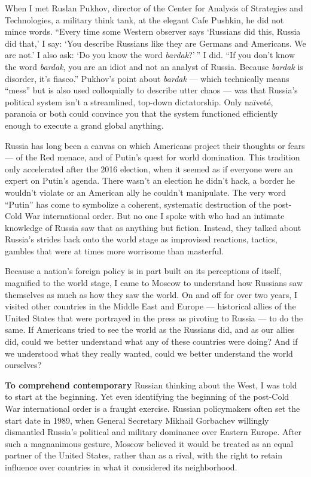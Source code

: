 When I met Ruslan Pukhov, director of the Center for Analysis of
Strategies and Technologies, a military think tank, at the elegant Cafe
Pushkin, he did not mince words. ``Every time some Western observer says
`Russians did this, Russia did that,' I say: `You describe Russians like
they are Germans and Americans. We are not.' I also ask: `Do you know
the word \emph{bardak}?' '' I did. ``If you don't know the word
\emph{bardak}, you are an idiot and not an analyst of Russia. Because
\emph{bardak} is disorder, it's fiasco.'' Pukhov's point about
\emph{bardak} --- which technically means ``mess'' but is also used
colloquially to describe utter chaos --- was that Russia's political
system isn't a streamlined, top-down dictatorship. Only naïveté,
paranoia or both could convince you that the system functioned
efficiently enough to execute a grand global anything.

Russia has long been a canvas on which Americans project their thoughts
or fears --- of the Red menace, and of Putin's quest for world
domination. This tradition only accelerated after the 2016 election,
when it seemed as if everyone were an expert on Putin's agenda. There
wasn't an election he didn't hack, a border he wouldn't violate or an
American ally he couldn't manipulate. The very word ``Putin'' has come
to symbolize a coherent, systematic destruction of the post-Cold War
international order. But no one I spoke with who had an intimate
knowledge of Russia saw that as anything but fiction. Instead, they
talked about Russia's strides back onto the world stage as improvised
reactions, tactics, gambles that were at times more worrisome than
masterful.

Because a nation's foreign policy is in part built on its perceptions of
itself, magnified to the world stage, I came to Moscow to understand how
Russians saw themselves as much as how they saw the world. On and off
for over two years, I visited other countries in the Middle East and
Europe --- historical allies of the United States that were portrayed in
the press as pivoting to Russia --- to do the same. If Americans tried
to see the world as the Russians did, and as our allies did, could we
better understand what any of these countries were doing? And if we
understood what they really wanted, could we better understand the world
ourselves?

\textbf{To comprehend contemporary} Russian thinking about the West, I
was told to start at the beginning. Yet even identifying the beginning
of the post-Cold War international order is a fraught exercise. Russian
policymakers often set the start date in 1989, when General Secretary
Mikhail Gorbachev willingly dismantled Russia's political and military
dominance over Eastern Europe. After such a magnanimous gesture, Moscow
believed it would be treated as an equal partner of the United States,
rather than as a rival, with the right to retain influence over
countries in what it considered its neighborhood.

